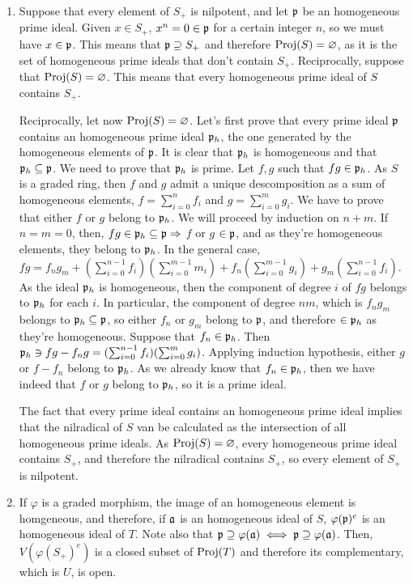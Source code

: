 \begin{sol}
	\begin{enumerate}[label=\alph*)]
		\item Suppose that every element of $S_+$ is nilpotent, and let $\mathfrak{p}$ be an homogeneous prime ideal. Given $x \in S_+$, $x^n = 0 \in \mathfrak{p}$ for a certain integer $n$, so we must have $x \in \mathfrak{p}$. This means that $\mathfrak{p} \supseteq S_+$ and therefore $\mathrm{Proj}(S) = \varnothing$, as it is the set of homogeneous prime ideals that don't contain $S_+$. Reciprocally, suppose that $\mathrm{Proj}(S) = \varnothing$. This means that every homogeneous prime ideal of $S$ contains $S_+$. 

		Reciprocally, let now $\mathrm{Proj}(S) = \varnothing$. Let's first prove that every prime ideal $\mathfrak{p}$ contains an homogeneous prime ideal $\mathfrak{p}_h$, the one generated by the homogeneous elements of $\mathfrak{p}$. It is clear that $\mathfrak{p}_h$ is homogeneous and that $\mathfrak{p}_h \subseteq \mathfrak{p}$. We need to prove that $\mathfrak{p}_h$ is prime. Let $f,g$ such that $fg \in \mathfrak{p}_h$. As $S$ is a graded ring, then $f$ and $g$ admit a unique descomposition as a sum of homogeneous elements, $f = \sum_{i = 0}^n f_i$ and $g = \sum_{i = 0}^m g_i$. We have to prove that either $f$ or $g$ belong to $\mathfrak{p}_h$. We will proceed by induction on $n+m$. If $n = m = 0$, then, $fg \in \mathfrak{p}_h \subseteq \mathfrak{p} \Rightarrow$ $f$ or $g$ $\in \mathfrak{p}$, and as they're homogeneous elements, they belong to $\mathfrak{p}_h$. In the general case, $fg = f_n g_m + (\sum_{i = 0}^{n-1} f_i)(\sum_{i = 0}^{m-1} m_i) + f_n(\sum_{i = 0}^{m-1} g_i) + g_m(\sum_{i = 0}^{n-1} f_i)$. As the ideal $\mathfrak{p}_h$ is homogeneous, then the component of degree $i$ of $fg$ belongs to $\mathfrak{p}_h$ for each $i$. In particular, the component of degree $nm$, which is $f_n g_m$ belongs to $\mathfrak{p}_h \subseteq \mathfrak{p}$, so either $f_n$ or $g_m$ belong to $\mathfrak{p}$, and therefore $\in \mathfrak{p}_h$ as they're homogeneous. Suppose that $f_n \in \mathfrak{p}_h$. Then $\mathfrak{p}_h \ni fg - f_ng = (\sum_{i = 0}^{n-1} f_i)(\sum_{i = 0}^m g_i)$. Applying induction hypothesis, either $g$ or $f-f_n$ belong to $\mathfrak{p}_h$. As we already know that $f_n \in \mathfrak{p}_h$, then we have indeed that $f$ or $g$ belong to $\mathfrak{p}_h$, so it is a prime ideal.

		The fact that every prime ideal contains an homogeneous prime ideal implies that the nilradical of $S$ van be calculated as the intersection of all homogeneous prime ideals. As $\mathrm{Proj}(S) = \varnothing$, every homogeneous prime ideal contains $S_+$, and therefore the nilradical contains $S_+$, so every element of $S_+$ is nilpotent.

		\item If $\varphi$ is a graded morphism, the image of an homogeneous element is homgeneous, and therefore, if $\mathfrak{a}$ is an homogeneous ideal of $S$, $\varphi(\mathfrak{p})^e$ is an homogeneous ideal of $T$. Note also that $\mathfrak{p} \supseteq \varphi(\mathfrak{a}) \iff \mathfrak{p} \supseteq \varphi(\mathfrak{a})$. Then, $V(\varphi(S_+)^e)$ is a closed subset of $\mathrm{Proj}(T)$ and therefore its complementary, which is $U$, is open.


\end{enumerate}
\end{sol}
